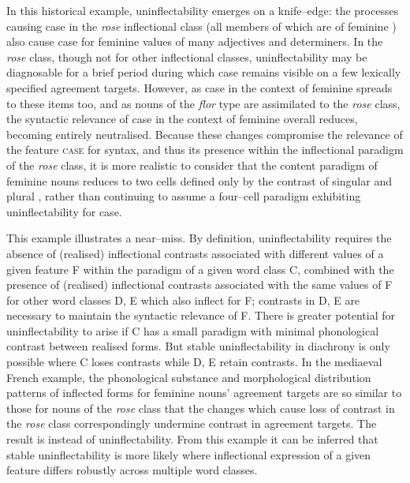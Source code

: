 \documentclass[output=paper,colorlinks,citecolor=brown]{langscibook}
\begin{document}
In this historical example, uninflectability emerges on a knife--edge: the processes causing case  in the \emph{rose} inflectional class (all members of which are of feminine ) also cause case  for feminine  values of many adjectives and determiners. In the \emph{rose} class, though not for other inflectional classes, uninflectability may be diagnosable for a brief period during which case remains visible on a few lexically specified agreement targets. However, as case  in the context of feminine  spreads to these items too, and as nouns of the \emph{flor} type are assimilated to the \emph{rose} class, the syntactic relevance of case in the context of feminine  overall reduces, becoming entirely neutralised. Because these changes compromise the relevance of the feature \textsc{case} for syntax, and thus its presence within the inflectional paradigm of the \emph{rose} class, it is more realistic to consider that the content paradigm of feminine nouns reduces to two cells defined only by the contrast of singular and plural \textsc{}, rather than continuing to assume a four--cell paradigm exhibiting uninflectability for case.

This example illustrates a near--miss. By definition, uninflectability requires the absence of (realised) inflectional contrasts associated with different values of a given feature F within the paradigm of a given word class C, combined with the presence of (realised) inflectional contrasts associated with the same values of F for other word classes D, E which also inflect for F; contrasts in D, E are necessary to maintain the syntactic relevance of F. There is greater potential for uninflectability to arise if C has a small paradigm with minimal phonological contrast between realised forms. But stable uninflectability in diachrony is only possible where C loses contrasts while D, E retain contrasts. In the mediaeval French example, the phonological substance and morphological distribution patterns of inflected forms for feminine nouns' agreement targets are so similar to those for nouns of the \emph{rose} class that the changes which cause loss of contrast in the \emph{rose} class correspondingly undermine contrast in agreement targets. The result is  instead of uninflectability. From this example it can be inferred that stable uninflectability is more likely where inflectional expression of a given feature differs robustly across multiple word classes.
\end{document}
